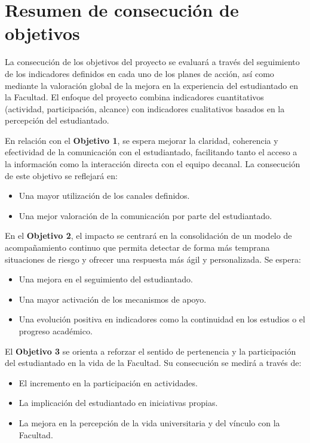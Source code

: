 \documentclass[11pt,a4paper]{scrreprt}
\begin{document}
\section{Resumen de consecución de objetivos}

\small
La consecución de los objetivos del proyecto se evaluará a través del seguimiento de los indicadores definidos en cada uno de los planes de acción, así como mediante la valoración global de la mejora en la experiencia del estudiantado en la Facultad. El enfoque del proyecto combina indicadores cuantitativos (actividad, participación, alcance) con indicadores cualitativos basados en la percepción del estudiantado.

En relación con el \textbf{Objetivo 1}, se espera mejorar la claridad, coherencia y efectividad de la comunicación con el estudiantado, facilitando tanto el acceso a la información como la interacción directa con el equipo decanal. La consecución de este objetivo se reflejará en:
\begin{itemize}[noitemsep,topsep=2pt]
\item Una mayor utilización de los canales definidos.
\item Una mejor valoración de la comunicación por parte del estudiantado.
\end{itemize}

En el \textbf{Objetivo 2}, el impacto se centrará en la consolidación de un modelo de acompañamiento continuo que permita detectar de forma más temprana situaciones de riesgo y ofrecer una respuesta más ágil y personalizada. Se espera:
\begin{itemize}[noitemsep,topsep=2pt]
\item Una mejora en el seguimiento del estudiantado.
\item Una mayor activación de los mecanismos de apoyo.
\item Una evolución positiva en indicadores como la continuidad en los estudios o el progreso académico.
\end{itemize}

El \textbf{Objetivo 3} se orienta a reforzar el sentido de pertenencia y la participación del estudiantado en la vida de la Facultad. Su consecución se medirá a través de:
\begin{itemize}[noitemsep,topsep=2pt]
\item El incremento en la participación en actividades.
\item La implicación del estudiantado en iniciativas propias.
\item La mejora en la percepción de la vida universitaria y del vínculo con la Facultad.
\end{itemize}
\end{document}
